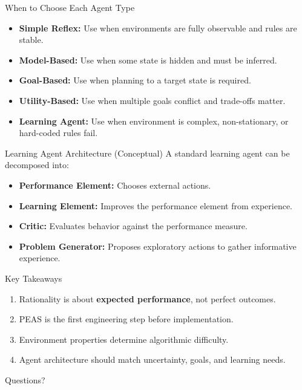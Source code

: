 \documentclass[10pt]{beamer}
\begin{document}
\begin{frame}{When to Choose Each Agent Type}
    \begin{itemize}
        \item \textbf{Simple Reflex:} Use when environments are fully observable and rules are stable.
        \item \textbf{Model-Based:} Use when some state is hidden and must be inferred.
        \item \textbf{Goal-Based:} Use when planning to a target state is required.
        \item \textbf{Utility-Based:} Use when multiple goals conflict and trade-offs matter.
        \item \textbf{Learning Agent:} Use when environment is complex, non-stationary, or hard-coded rules fail.
    \end{itemize}
\end{frame}

\begin{frame}{Learning Agent Architecture (Conceptual)}
    A standard learning agent can be decomposed into:
    \begin{itemize}
        \item \textbf{Performance Element:} Chooses external actions.
        \item \textbf{Learning Element:} Improves the performance element from experience.
        \item \textbf{Critic:} Evaluates behavior against the performance measure.
        \item \textbf{Problem Generator:} Proposes exploratory actions to gather informative experience.
    \end{itemize}
\end{frame}

\begin{frame}{Key Takeaways}
    \begin{enumerate}
        \item Rationality is about \textbf{expected performance}, not perfect outcomes.
        \item PEAS is the first engineering step before implementation.
        \item Environment properties determine algorithmic difficulty.
        \item Agent architecture should match uncertainty, goals, and learning needs.
    \end{enumerate}
\end{frame}

\begin{frame}[standout]
    Questions?
\end{frame}
\end{document}
